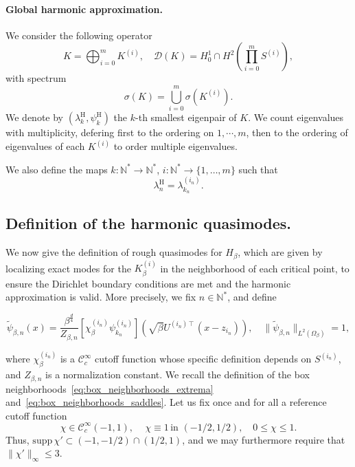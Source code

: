 \documentclass[10pt]{article}
\newcommand{\psitilde}{\widetilde\psi}
\newcommand{\N}{\mathbb N}
\newcommand{\1}{\mathbbm 1}
\begin{document}
    \paragraph{Global harmonic approximation.\newline}
    We consider the following operator
    \begin{equation}\label{eq:global_harmonic_approximation} K = \bigoplus_{i=0}^m K^{(i)},\quad \mathcal D(K) = H_0^1 \cap H^2 \left(\prod_{i=0}^m S^{(i)}\right),\end{equation}
    with spectrum 
    $$ \sigma(K) = \bigcup_{i=0}^m \sigma(K^{(i)}).$$
    We denote by $(\lambda_k^{\mathrm{H}},\psi_k^{\mathrm{H}})$ the $k$-th smallest eigenpair of $K$. We count eigenvalues with multiplicity, defering first to the ordering on $1,\dotsm,m$, then to the ordering of eigenvalues of each $K^{(i)}$ to order multiple eigenvalues.

    We also define the maps $k:\N^*\to \N^*$, $i:\N^*\to\{1,\dots,m\}$ such that
    $$ \lambda_n^{\mathrm{H}} = \lambda_{k_n}^{(i_n)}.$$




    \subsection{Definition of the harmonic quasimodes.}
    We now give the definition of rough quasimodes for $H_\beta$, which are given by localizing exact modes for the $K_\beta^{(i)}$ in the neighborhood of each critical point, to ensure the Dirichlet boundary conditions are met and the harmonic approximation is valid.
     More precisely, we fix $n\in\N^*$, and define

    \begin{equation}
        \label{eq:def_harm_quasimode}
        \psitilde_{\beta,n}(x) = \frac{\beta^{\frac d4}}{Z_{\beta,n}}\left[\chi_\beta^{(i_n)}\psi_{k_n}^{(i_n)}\right](\sqrt\beta U^{(i_n)\intercal}(x-z_{i_n})),\quad \|\psitilde_{\beta,n}\|_{L^2(\Omega_\beta)}=1,
    \end{equation}

    where $\chi_\beta^{(i_n)}$ is a $\mathcal C^\infty_c$ cutoff function whose specific definition depends on $S^{(i_n)}$, and $Z_{\beta,n}$ is a normalization constant.
    We recall the definition of the box neighborhoods~\eqref{eq:box_neighborhoods_extrema} and~\eqref{eq:box_neighborhoods_saddles}.
    Let us fix once and for all a reference cutoff function
    \begin{equation}
        \chi\in\mathcal C^\infty_c (-1,1), \,\quad \chi \equiv 1\,\text{in }(-1/2,1/2),\quad 0\leq \chi\leq 1.
    \end{equation}
    Thus, $\mathrm{supp}\,\chi' \subset (-1,-1/2) \cap (1/2,1)$, and we may furthermore require that $\|\chi'\|_\infty \leq 3$.
 
\end{document}
